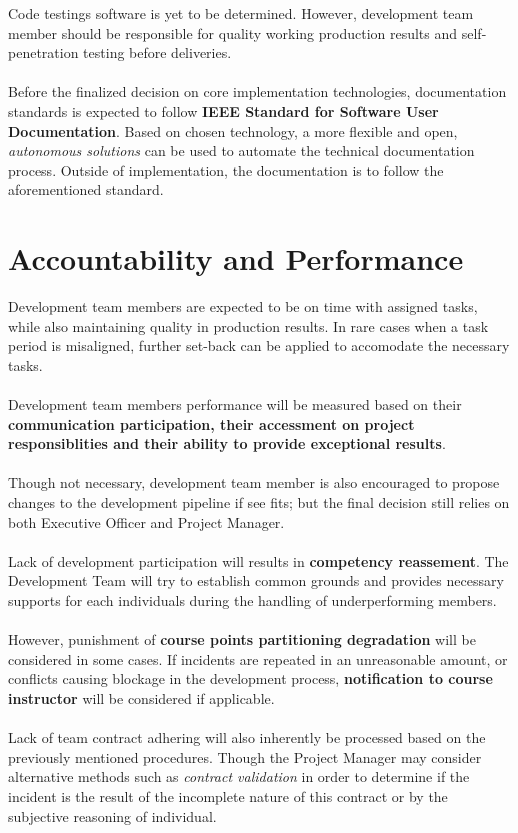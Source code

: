     Code testings software is yet to be determined. However, development team member should be responsible for quality working production results and self-penetration
    testing before deliveries.
    \\\\
    Before the finalized decision on core implementation technologies, documentation standards is expected to follow \textbf{IEEE Standard for Software User Documentation}.
    Based on chosen technology, a more flexible and open, \textit{autonomous solutions} can be used to automate the technical documentation process. Outside of implementation,
    the documentation is to follow the aforementioned standard.

    \section{Accountability and Performance}
    Development team members are expected to be on time with assigned tasks, while also maintaining quality in production results. In rare cases when a task period
    is misaligned, further set-back can be applied to accomodate the necessary tasks.
    \\\\
    Development team members performance will be measured based on their \textbf{communication participation, their accessment on project responsiblities and their ability to
    provide exceptional results}. 
    \\\\
    Though not necessary, development team member is also encouraged to propose changes to the development pipeline if see fits; but the 
    final decision still relies on both Executive Officer and Project Manager.
    \\\\
    Lack of development participation will results in \textbf{competency reassement}. The Development Team will try to establish common grounds and provides necessary sup­ports
    for each individuals during the handling of underperforming members.
    \\\\
    However, punishment of \textbf{course points partitioning degradation} will be considered in some cases.
    If incidents are repeated in an unreasonable amount, or conflicts causing blockage in the development process, \textbf{notification to course instructor}
    will be considered if applicable.
    \\\\
    Lack of team contract adhering will also inherently be processed based on the previously mentioned procedures. Though the Project Manager may consider
    alternative methods such as \textit{contract validation} in order to determine if the incident is the result of the incomplete nature of this contract or by the
    subjective reasoning of individual.